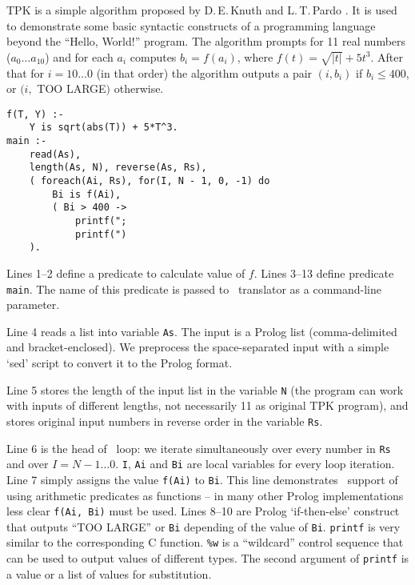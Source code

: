 \documentclass{acm_proc_article-sp}
\begin{document}
TPK is a simple algorithm proposed by D.\,E.\,Knuth and L.\,T.\,Pardo  \cite{knuth1976early}. 
It is used to demonstrate some basic syntactic constructs of a programming language beyond the ``Hello, World!'' program.
The algorithm prompts for 11 real numbers ($a_0 \dots a_{10}$) and for each $a_i$ computes $b_i = f(a_i)$, where $f(t) = \sqrt{|t|} + 5 {t}^3$.
After that for $i = 10 \dots 0$ (in that order) the algorithm outputs a pair $(i, b_i)$ if $b_i \leq 400$, or $(i,$ TOO LARGE$)$ otherwise.
\clearpage
\begin{lstlisting}[caption={TPK algorithm in \eclipse}]
f(T, Y) :-
    Y is sqrt(abs(T)) + 5*T^3.
main :-
    read(As), 
    length(As, N), reverse(As, Rs),
    ( foreach(Ai, Rs), for(I, N - 1, 0, -1) do
        Bi is f(Ai),
        ( Bi > 400 ->
            printf(";
            printf(")
    ).
\end{lstlisting}

Lines 1--2 define a predicate to calculate value of $f$. 
Lines 3--13 define predicate \texttt{main}.  
The name of this predicate is passed to \eclipse\ translator as a command-line parameter.

Line 4 reads a list into variable \texttt{As}.
The input is a Prolog list (comma-delimited and bracket-enclosed).
We preprocess the space-separated input with a simple `sed' script to convert it to the Prolog format.

Line 5 stores the length of the input list in the variable \texttt{N} (the program can work with inputs of different lengths, not necessarily 11 as original TPK program),
and stores original input numbers in reverse order in the variable \texttt{Rs}.

Line 6 is the head of \eclipse\ loop: we iterate simultaneously over every number in \texttt{Rs} and over $I = N-1 \dots 0$. 
\texttt{I}, \texttt{Ai} and \texttt{Bi} are local variables for every loop iteration.
Line 7 simply assigns the value \texttt{f(Ai)} to \texttt{Bi}. 
This line demonstrates \eclipse\ support of using arithmetic predicates as functions -- in many other Prolog implementations less clear \texttt{f(Ai, Bi)} must be used.
Lines 8--10 are Prolog `if-then-else' construct that outputs ``TOO LARGE'' or \texttt{Bi} depending of the value of \texttt{Bi}.
\texttt{printf} is very similar to the corresponding C function. \texttt{\%w} is a ``wildcard'' control sequence that can be used to output values of different types.
The second argument of \texttt{printf} is a value or a list of values for substitution.
\end{document}
